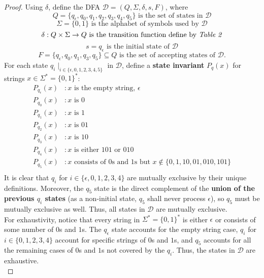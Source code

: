 \documentclass[12pt]{article}
\begin{document}
\begin{proof}
    Using $\delta$, define the DFA $\mathcal{D} = (Q, \Sigma, \delta, s, F)$, where
    \[
        Q = \{ q_{\epsilon}, q_0, q_1, q_2, q_3, q_4, q_5 \} \text{ is the set of states in } \mathcal{D}
    \]
    \[
        \Sigma = \{ 0, 1 \} \text{ is the alphabet of symbols used by } \mathcal{D}
    \]
    \[
        \delta : Q \times \Sigma \to Q \text{ is the transition function define by \textit{Table 2}}
    \]
    \[
        s = q_{\epsilon} \text{ is the initial state of } \mathcal{D} 
    \]
    \[
        F = \{ q_{\epsilon}, q_0, q_1, q_3, q_5 \} \subseteq Q \text{ is the set of accepting states of } \mathcal{D} \text{.}
    \]
    For each state $q_i \mid_{i \in \{\epsilon, 0, 1, 2, 3, 4, 5\}}$ in $\mathcal{D}$, define a \textbf{state invariant} $P_q(x)$ for strings $x \in \Sigma^* = \{0, 1\}^*$:
    \begin{equation*}
            \begin{aligned}
                P_{q_\epsilon}(x)&: \text{$x$ is the empty string, } \epsilon \\
                P_{q_0}(x)&: \text{$x$ is $0$} \\
                P_{q_1}(x)&: \text{$x$ is $1$} \\
                P_{q_2}(x)&: \text{$x$ is $01$} \\
                P_{q_3}(x)&: \text{$x$ is $10$} \\
                P_{q_4}(x)&: \text{$x$ is either $101$ or $010$} \\
                P_{q_5}(x)&: \text{$x$ consists of $0$s and $1$s but $x \notin \{0, 1, 10, 01, 010, 101\}$} \\
            \end{aligned}
    \end{equation*}
    It is clear that $q_i$ for $i \in \{\epsilon, 0, 1, 2, 3, 4\}$ are mutually exclusive by their unique definitions. Moreover, the $q_5$ state is the direct complement of the \textbf{union of the previous $q_i$ states} (as a non-initial state, $q_5$ shall never process $\epsilon$), so $q_5$ must be mutually exclusive as well. Thus, all states in $\mathcal{D}$ are mutually exclusive. \\
    For exhaustivity, notice that every string in $\Sigma^* = \{0, 1\}^*$ is either $\epsilon$ or consists of some number of $0$s and $1$s. The $q_\epsilon$ state accounts for the empty string case, $q_i$ for $i \in \{0, 1, 2, 3, 4\}$ account for specific strings of $0$s and $1$s, and $q_5$ accounts for all the remaining cases of $0$s and $1$s not covered by the $q_i$. Thus, the states in $\mathcal{D}$ are exhaustive. \\

\end{proof}
\end{document}
